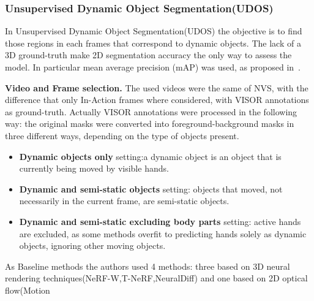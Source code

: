 \subsubsection{Unsupervised Dynamic Object Segmentation(UDOS)}
In Unsupervised Dynamic Object Segmentation(UDOS) the objective is to find those regions in each frames that correspond to dynamic objects. The lack
of a 3D ground-truth make 2D segmentation accuracy the only way to assess the model. In particular mean average precision (mAP) was used, as proposed in~\cite{neuraldiff}.
   
\textbf{Video and Frame selection.} The used videos were the same of NVS, with the difference that only In-Action frames where considered,
 with VISOR annotations as ground-truth. Actually VISOR annotations were processed in the following way: the original masks were converted into 
 foreground-background masks in three different ways, depending on the type of objects present.
 \begin{itemize}
    \item \textbf{Dynamic objects only} setting:a dynamic object is an object that is currently being moved by visible hands.
    \item \textbf{Dynamic and semi-static objects} setting: objects that moved, not necessarily in the current frame, are semi-static objects.
    \item \textbf{Dynamic and semi-static excluding body parts} setting: active hands are excluded, as some methods overfit to predicting hands solely
    as dynamic objects, ignoring other moving objects.
 \end{itemize}
 As Baseline methods the authors used 4 methods: three based on 3D neural rendering techniques(NeRF-W,T-NeRF,NeuralDiff) and one based on 2D optical flow(Motion
 
